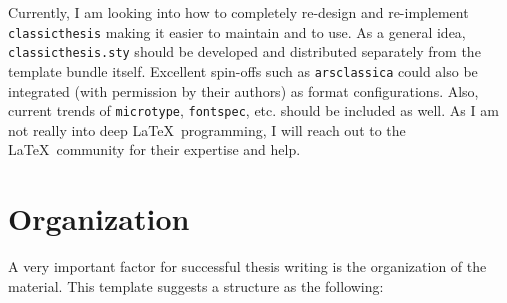 Currently, I am looking into how to completely re-design and
re-implement \texttt{classicthesis} making it easier to maintain and
to use. As a general idea, \texttt{classicthesis.sty} should be
developed and distributed separately from the template bundle itself.
Excellent spin-offs such as \texttt{arsclassica} could also be
integrated (with permission by their authors) as format configurations.
Also, current trends of \texttt{microtype}, \texttt{fontspec}, etc.
should be included as well. As I am not really into deep
\LaTeX\ programming,
I will reach out to the \LaTeX\ community for their expertise and help.


\section{Organization}
A very important factor for successful thesis writing is the
organization of the material. This template suggests a structure as
the following:
